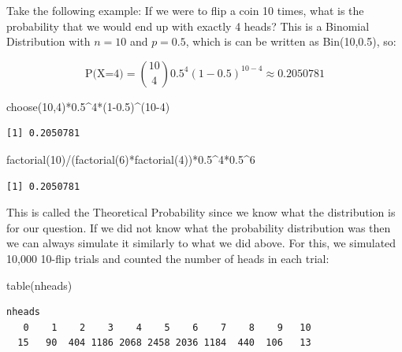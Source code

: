 \documentclass[
  letterpaper,
  DIV=11,
  numbers=noendperiod]{scrreprt}
\newenvironment{Shaded}{\begin{snugshade}}{\end{snugshade}}
\newcommand{\DecValTok}[1]{\textcolor[rgb]{0.68,0.00,0.00}{#1}}
\newcommand{\FloatTok}[1]{\textcolor[rgb]{0.68,0.00,0.00}{#1}}
\newcommand{\FunctionTok}[1]{\textcolor[rgb]{0.28,0.35,0.67}{#1}}
\newcommand{\NormalTok}[1]{\textcolor[rgb]{0.00,0.23,0.31}{#1}}
\newcommand{\SpecialCharTok}[1]{\textcolor[rgb]{0.37,0.37,0.37}{#1}}
\begin{document}
Take the following example: If we were to flip a coin 10 times, what is
the probability that we would end up with exactly 4 heads? This is a
Binomial Distribution with \(n=10\) and \(p=0.5\), which is can be
written as Bin(10,0.5), so:

\[ \text{P(X=4)}={10\choose 4}0.5^4(1-0.5)^{10-4}\approx 0.2050781 \]

\begin{Shaded}
\begin{Highlighting}[]
\FunctionTok{choose}\NormalTok{(}\DecValTok{10}\NormalTok{,}\DecValTok{4}\NormalTok{)}\SpecialCharTok{*}\FloatTok{0.5}\SpecialCharTok{\^{}}\DecValTok{4}\SpecialCharTok{*}\NormalTok{(}\DecValTok{1}\FloatTok{{-}0.5}\NormalTok{)}\SpecialCharTok{\^{}}\NormalTok{(}\DecValTok{10{-}4}\NormalTok{)}
\end{Highlighting}
\end{Shaded}

\begin{verbatim}
[1] 0.2050781
\end{verbatim}

\begin{Shaded}
\begin{Highlighting}[]
\FunctionTok{factorial}\NormalTok{(}\DecValTok{10}\NormalTok{)}\SpecialCharTok{/}\NormalTok{(}\FunctionTok{factorial}\NormalTok{(}\DecValTok{6}\NormalTok{)}\SpecialCharTok{*}\FunctionTok{factorial}\NormalTok{(}\DecValTok{4}\NormalTok{))}\SpecialCharTok{*}\FloatTok{0.5}\SpecialCharTok{\^{}}\DecValTok{4}\SpecialCharTok{*}\FloatTok{0.5}\SpecialCharTok{\^{}}\DecValTok{6}
\end{Highlighting}
\end{Shaded}

\begin{verbatim}
[1] 0.2050781
\end{verbatim}

This is called the Theoretical Probability since we know what the
distribution is for our question. If we did not know what the
probability distribution was then we can always simulate it similarly to
what we did above. For this, we simulated 10,000 10-flip trials and
counted the number of heads in each trial:

\begin{Shaded}
\begin{Highlighting}[]
\FunctionTok{table}\NormalTok{(nheads)}
\end{Highlighting}
\end{Shaded}

\begin{verbatim}
nheads
   0    1    2    3    4    5    6    7    8    9   10 
  15   90  404 1186 2068 2458 2036 1184  440  106   13 
\end{verbatim}
\end{document}
